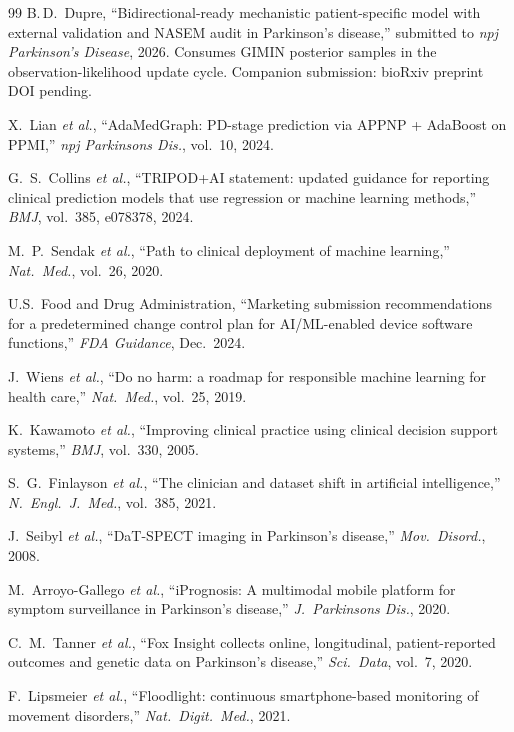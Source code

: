 \documentclass[11pt,letterpaper]{article}
\begin{document}
\begin{thebibliography}{99}
B.\,D.~Dupre, ``Bidirectional-ready mechanistic patient-specific model with external validation and NASEM audit in Parkinson's disease,'' submitted to \textit{npj Parkinson's Disease}, 2026. Consumes GIMIN posterior samples in the observation-likelihood update cycle. Companion submission: bioRxiv preprint DOI pending.

X.~Lian \textit{et al.}, ``AdaMedGraph: PD-stage prediction via APPNP + AdaBoost on PPMI,'' \textit{npj Parkinsons Dis.}, vol.~10, 2024.

G.~S.~Collins \textit{et al.}, ``TRIPOD+AI statement: updated guidance for reporting clinical prediction models that use regression or machine learning methods,'' \textit{BMJ}, vol.~385, e078378, 2024.

M.~P.~Sendak \textit{et al.}, ``Path to clinical deployment of machine learning,'' \textit{Nat.\ Med.}, vol.~26, 2020.

U.S.\ Food and Drug Administration, ``Marketing submission recommendations for a predetermined change control plan for AI/ML-enabled device software functions,'' \textit{FDA Guidance}, Dec.~2024.

J.~Wiens \textit{et al.}, ``Do no harm: a roadmap for responsible machine learning for health care,'' \textit{Nat.\ Med.}, vol.~25, 2019.

K.~Kawamoto \textit{et al.}, ``Improving clinical practice using clinical decision support systems,'' \textit{BMJ}, vol.~330, 2005.

S.~G.~Finlayson \textit{et al.}, ``The clinician and dataset shift in artificial intelligence,'' \textit{N.\ Engl.\ J.\ Med.}, vol.~385, 2021.

J.~Seibyl \textit{et al.}, ``DaT-SPECT imaging in Parkinson's disease,'' \textit{Mov.\ Disord.}, 2008.

M.~Arroyo-Gallego \textit{et al.}, ``iPrognosis: A multimodal mobile platform for symptom surveillance in Parkinson's disease,'' \textit{J.\ Parkinsons Dis.}, 2020.

C.~M.~Tanner \textit{et al.}, ``Fox Insight collects online, longitudinal, patient-reported outcomes and genetic data on Parkinson's disease,'' \textit{Sci.\ Data}, vol.~7, 2020.

F.~Lipsmeier \textit{et al.}, ``Floodlight: continuous smartphone-based monitoring of movement disorders,'' \textit{Nat.\ Digit.\ Med.}, 2021.

\end{thebibliography}
\end{document}
